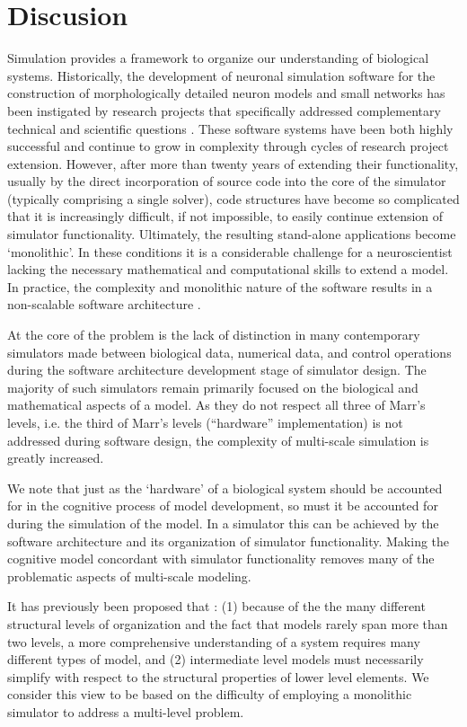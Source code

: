 \documentclass{article}
\begin{document}
\section{Discusion}

Simulation provides a framework to organize our understanding of biological systems. Historically, the development of neuronal simulation software for the construction of morphologically detailed neuron models and small networks has been instigated by research projects that specifically addressed complementary technical and scientific questions \cite{Moore:2010vn}. These software systems have been both highly successful and continue to grow in complexity through cycles of research project extension. However, after more than twenty years of extending their functionality, usually by the direct incorporation of source code into the core of the simulator (typically comprising a single solver), code structures have become so complicated that it is increasingly difficult, if not impossible, to easily continue extension of simulator functionality. Ultimately, the resulting stand-alone applications become `monolithic'. In these conditions it is a considerable challenge for a neuroscientist lacking the necessary mathematical and computational skills to extend a model. In practice, the complexity and monolithic nature of the software results in a non-scalable software architecture \cite{jaeger02:_comput_neuros_realis_model_exper}.

At the core of the problem is the lack of distinction in many contemporary simulators made between biological data, numerical data, and control operations during the software architecture development stage of simulator design. The majority of such simulators remain primarily focused on the biological and mathematical aspects of a model. As they do not respect all three of Marr's levels, i.e. the third of Marr's levels (``hardware'' implementation) is not addressed during software design, the complexity of multi-scale simulation is greatly increased. 

We note that just as the `hardware' of a biological system should be accounted for in the cognitive process of model development, so must it be accounted for during the simulation of the model. In a simulator this can be achieved by the software architecture and its organization of simulator functionality. Making the cognitive model concordant with simulator functionality removes many of the problematic aspects of multi-scale modeling.  

It has previously been proposed that \cite{Sejnowski:1988fk}: (1) because of the the many different structural levels of organization and the fact that models rarely span more than two levels, a more comprehensive understanding of a system requires many different types of model, and (2) intermediate level models must necessarily simplify with respect to the structural properties of lower level elements. We consider this view to be based on the difficulty of employing a monolithic simulator to address a multi-level problem.
\end{document}
